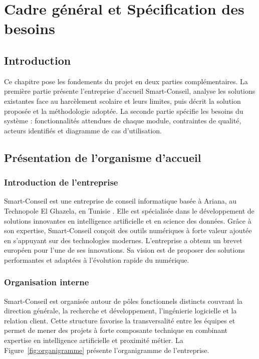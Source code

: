 \chapter{Cadre général et Spécification des besoins}

\section*{Introduction}

Ce chapitre pose les fondements du projet en deux parties complémentaires.
La première partie présente l'entreprise d'accueil Smart-Conseil, analyse les solutions existantes face au harcèlement scolaire et leurs limites, puis décrit la solution proposée et la méthodologie adoptée.
La seconde partie spécifie les besoins du système : fonctionnalités attendues de chaque module, contraintes de qualité, acteurs identifiés et diagramme de cas d'utilisation.

\section{Présentation de l'organisme d'accueil}

\subsection{Introduction de l'entreprise}

Smart-Conseil est une entreprise de conseil informatique basée à Ariana, au Technopole El Ghazela, en Tunisie \cite{smartconseil}.
Elle est spécialisée dans le développement de solutions innovantes en intelligence artificielle et en science des données.
Grâce à son expertise, Smart-Conseil conçoit des outils numériques à forte valeur ajoutée en s'appuyant sur des technologies modernes.
L'entreprise a obtenu un brevet européen pour l'une de ses innovations.
Sa vision est de proposer des solutions performantes et adaptées à l'évolution rapide du numérique.

\subsection{Organisation interne}

Smart-Conseil est organisée autour de pôles fonctionnels distincts couvrant la direction générale,
la recherche et développement, l'ingénierie logicielle et la relation client.
Cette structure favorise la transversalité entre les équipes et permet de mener des projets
à forte composante technique en combinant expertise en intelligence artificielle et proximité métier.
La Figure~\ref{fig:organigramme} présente l'organigramme de l'entreprise.


